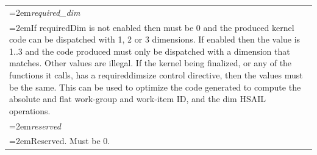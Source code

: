 \documentclass[final,oneside]{book}
\newcommand{\reffld}[1]{\textit{#1}}
\begin{document}
\begin{longtable}{@{}>{\hangindent=2em}p{\textwidth}}
\hypertarget{hsa_\-ext_\-control_\-directives_\-t.required_\-dim}{\reffld{required_\-dim}}\\\hspace{2em}If requiredDim is not enabled then must be 0 and the produced kernel code can be dispatched with 1, 2 or 3 dimensions. If enabled then the value is 1..3 and the code produced must only be dispatched with a dimension that matches. Other values are illegal. If the kernel being finalized, or any of the functions it calls, has a requireddimsize control directive, then the values must be the same. This can be used to optimize the code generated to compute the absolute and flat work-group and work-item ID, and the dim HSAIL operations.\\[2mm]
\hypertarget{hsa_\-ext_\-control_\-directives_\-t.reserved}{\reffld{reserved}}\\\hspace{2em}Reserved. Must be 0.
\end{longtable}
\end{document}
